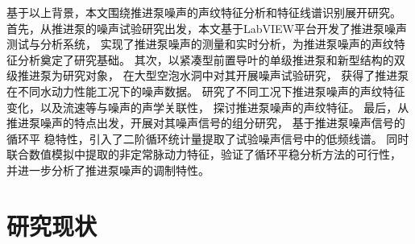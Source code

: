 \begin{comment}
传统的频谱分析方法已经无法准确的对流致激励特征声源进行识别，以及对推进泵的运行状态进行表征。
其噪声信号中存在复杂的干扰因素：其一，推进泵处在复杂的背景环境声场中，
动力系统等辅助结构产生的辐射噪声也给目标声源信号带来了很大干扰，影响
测试系统对推进泵目标真实辐射噪声信号的监测；其二，推进泵结构复杂，
推进泵辐射噪声场同时存在转子旋转声源，以及定子导管结构的静止声源，
其辐射噪声具有分量复杂性。基于上述因素，监测系统接收到的目标声场信号的信噪比较低。特征信
号如流致激励源特征频率、轴频等与其他背景噪声相比均较为微弱，
给基于传统噪声特征提取方法带来了困难，难以准确的识别噪声信号的流致激励源特征。
其次，推进泵噪声存在显著的调制特性，调制现象包含着丰富的流场信息，
但是传统的频谱分析及解调方法无法实现高精度低频调制特征的提取。
因此，开展低信噪比工况下的推进泵噪声信号的低频特征提取技术研究
有重要的理论和工程意义。
\end{comment}

基于以上背景，本文围绕推进泵噪声的声纹特征分析和特征线谱识别展开研究。
首先，从推进泵的噪声试验研究出发，本文基于LabVIEW平台开发了推进泵噪声测试与分析系统，
实现了推进泵噪声的测量和实时分析，为推进泵噪声的声纹特征分析奠定了研究基础。 
其次，以紧凑型前置导叶的单级推进泵和新型结构的双级推进泵为研究对象，
在大型空泡水洞中对其开展噪声试验研究，
获得了推进泵在不同水动力性能工况下的噪声数据。
研究了不同工况下推进泵噪声的声纹特征变化，以及流速等与噪声的声学关联性，
探讨推进泵噪声的声纹特征。
最后，从推进泵噪声的特点出发，开展对其噪声信号的组分研究，
基于推进泵噪声信号的循环平
稳特性，引入了二阶循环统计量提取了试验噪声信号中的低频线谱。
同时联合数值模拟中提取的非定常脉动力特征，验证了循环平稳分析方法的可行性，
并进一步分析了推进泵噪声的调制特性。

\begin{comment}

目前针对推进泵流致激励特性的研究已经开展了大量工作，研究主要集中通过数值模拟获取
压力脉动特性、激振力特性等方面，难以通过试验精确获取流致激励源特征。
其中蕴含着丰富的流致激励
源信息，但是传统的频谱分析及解调方法无法实现高精度低频调制特征的提取。

\end{comment}

\section{研究现状}
